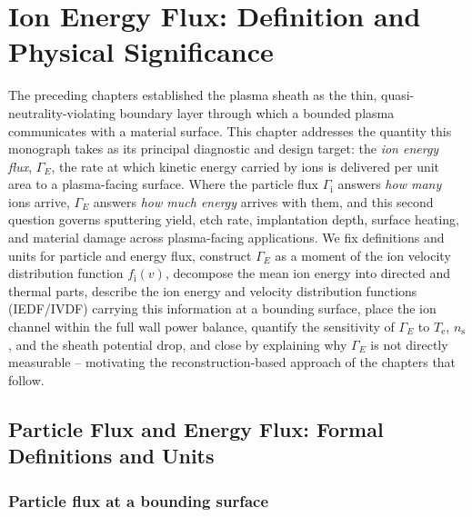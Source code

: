 \chapter{Ion Energy Flux: Definition and Physical Significance}
\label{ch:ief}

The preceding chapters established the plasma sheath as the thin, quasi-neutrality-violating boundary layer through which a bounded plasma communicates with a material surface. This chapter addresses the quantity this monograph takes as its principal diagnostic and design target: the \emph{ion energy flux}, $\Gamma_{E}$, the rate at which kinetic energy carried by ions is delivered per unit area to a plasma-facing surface. Where the particle flux $\Gamma_{\mathrm{i}}$ answers \emph{how many} ions arrive, $\Gamma_E$ answers \emph{how much energy} arrives with them, and this second question governs sputtering yield, etch rate, implantation depth, surface heating, and material damage across plasma-facing applications. We fix definitions and units for particle and energy flux, construct $\Gamma_{E}$ as a moment of the ion velocity distribution function $f_{\mathrm{i}}(v)$, decompose the mean ion energy into directed and thermal parts, describe the ion energy and velocity distribution functions (IEDF/IVDF) carrying this information at a bounding surface, place the ion channel within the full wall power balance, quantify the sensitivity of $\Gamma_{E}$ to $T_{\mathrm{e}}$, $n_{\mathrm{s}}$, and the sheath potential drop, and close by explaining why $\Gamma_{E}$ is not directly measurable -- motivating the reconstruction-based approach of the chapters that follow.

\section{Particle Flux and Energy Flux: Formal Definitions and Units}

\subsection{Particle flux at a bounding surface}

